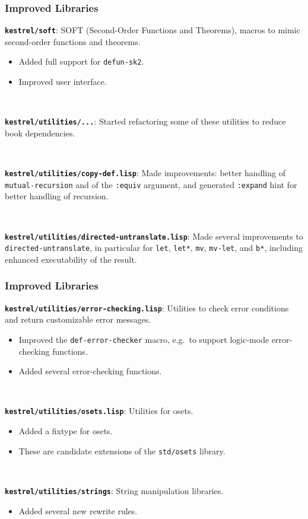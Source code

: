 \documentclass{beamer}
\newcommand{\code}[1]{\texttt{#1}}
\newcommand{\bookpath}[1]{\textbf{\code{#1}}}
\newcommand{\implibtitle}{\frametitle{Improved Libraries}}
\begin{document}

\begin{frame}

\implibtitle

\bookpath{kestrel/soft}:
SOFT (Second-Order Functions and Theorems),
macros to mimic second-order functions and theorems.
\begin{itemize}
\item
Added full support for \code{defun-sk2}.
\item
Improved user interface.
\end{itemize}

\

\bookpath{kestrel/utilities/...}:
Started refactoring some of these utilities to reduce book dependencies.

\

\bookpath{kestrel/utilities/copy-def.lisp}:
Made improvements: better handling of \code{mutual-recursion} and of
the \code{:equiv} argument, and generated \code{:expand} hint for better
handling of recursion.

\

\bookpath{kestrel/utilities/directed-untranslate.lisp}:
Made several improvements to \code{directed-untranslate}, in particular
for \code{let}, \code{let*}, \code{mv}, \code{mv-let}, and \code{b*},
including enhanced executability of the result.

\end{frame}


\begin{frame}

\implibtitle

\bookpath{kestrel/utilities/error-checking.lisp}:
Utilities to check error conditions and return customizable error messages.
\begin{itemize}
\item
Improved the \code{def-error-checker} macro,
e.g.\ to support logic-mode error-checking functions.
\item
Added several error-checking functions.
\end{itemize}

\

\bookpath{kestrel/utilities/osets.lisp}:
Utilities for osets.
\begin{itemize}
\item
Added a fixtype for osets.
\item
These are candidate extensions of the \code{std/osets} library.
\end{itemize}

\

\bookpath{kestrel/utilities/strings}:
String manipulation libraries.
\begin{itemize}
\item Added several new rewrite rules.
\end{itemize}

\end{frame}
\end{document}
